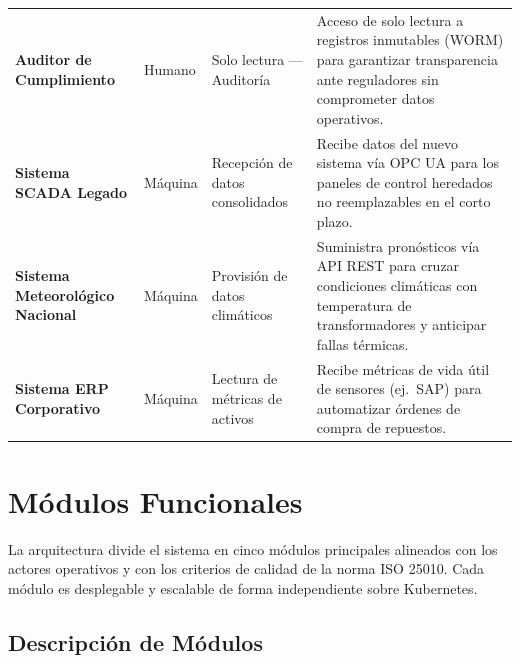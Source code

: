 \documentclass[12pt, letterpaper]{article}
\begin{document}
\begin{longtable}{
  P{3.0cm}
  C{1.8cm}
  P{3.2cm}
  P{5.7cm}
}
\textbf{Auditor de Cumplimiento} &
  Humano & Solo lectura --- Auditoría &
  Acceso de solo lectura a registros inmutables (WORM) para garantizar transparencia
  ante reguladores sin comprometer datos operativos. \\

\textbf{Sistema SCADA Legado} &
  Máquina & Recepción de datos consolidados &
  Recibe datos del nuevo sistema vía OPC UA para los paneles de control heredados no
  reemplazables en el corto plazo. \\

\textbf{Sistema Meteorológico Nacional} &
  Máquina & Provisión de datos climáticos &
  Suministra pronósticos vía API REST para cruzar condiciones climáticas con temperatura
  de transformadores y anticipar fallas térmicas. \\

\textbf{Sistema ERP Corporativo} &
  Máquina & Lectura de métricas de activos &
  Recibe métricas de vida útil de sensores (ej.\ SAP) para automatizar órdenes de
  compra de repuestos. \\

\end{longtable}

\section{Módulos Funcionales}

La arquitectura divide el sistema en cinco módulos principales alineados con los actores
operativos y con los criterios de calidad de la norma ISO 25010. Cada módulo es desplegable
y escalable de forma independiente sobre Kubernetes.

\subsection{Descripción de Módulos}
\end{document}
